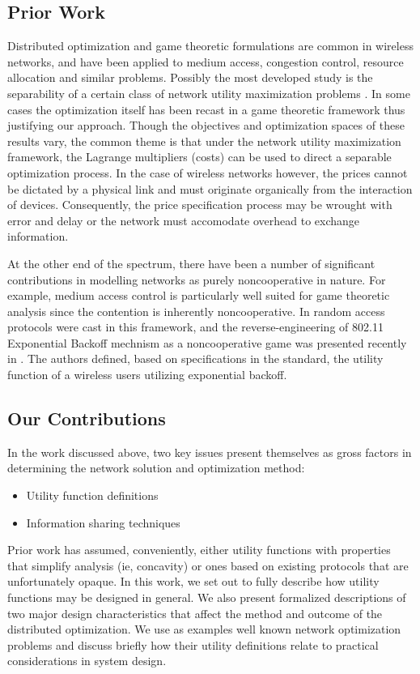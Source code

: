 \documentclass[11pt]{IEEEtran}
\theoremstyle{definition}
\begin{document}
\subsection{Prior Work}
Distributed optimization and game theoretic formulations are common in wireless networks, and have been applied to medium access, congestion control, resource allocation and similar problems. Possibly the most developed study is the separability of a certain class of network utility maximization problems \cite{FB04,CLD05,NKGB00,WK03}. In some cases the optimization itself has been recast in a game theoretic framework \cite{FB04} thus justifying our approach. Though the objectives and optimization spaces of these results vary, the common theme is that under the network utility maximization framework, the Lagrange multipliers (costs) can be used to direct a separable optimization process. In the case of wireless networks however, the prices cannot be dictated by a physical link and must originate organically from the interaction of devices. Consequently, the price specification process may be wrought with error and delay or the network must accomodate overhead to exchange information. 

At the other end of the spectrum, there have been a number of significant contributions in modelling networks as purely noncooperative in nature. For example, medium access control is particularly well suited for game theoretic analysis since the contention is inherently noncooperative. In \cite{CLD06} random access protocols were cast in this framework, and the reverse-engineering of 802.11 Exponential Backoff mechnism as a noncooperative game was presented recently in \cite{LTHCC07}. The authors defined, based on specifications in the standard, the utility function of a wireless users utilizing exponential backoff.

\subsection{Our Contributions}
In the work discussed above, two key issues present themselves as gross factors in determining the network solution and optimization method:

\begin{itemize}
  \item Utility function definitions
  \item Information sharing techniques
\end{itemize}

Prior work has assumed, conveniently, either utility functions with properties that simplify analysis (ie, concavity) or ones
based on existing protocols that are unfortunately opaque. In this work, we set out to fully describe how utility functions may be designed in general. We also present formalized descriptions of two major design characteristics that affect the method and outcome of the distributed optimization. We use as examples well known network optimization problems and discuss briefly how their utility definitions relate to practical considerations in system design.
\end{document}
